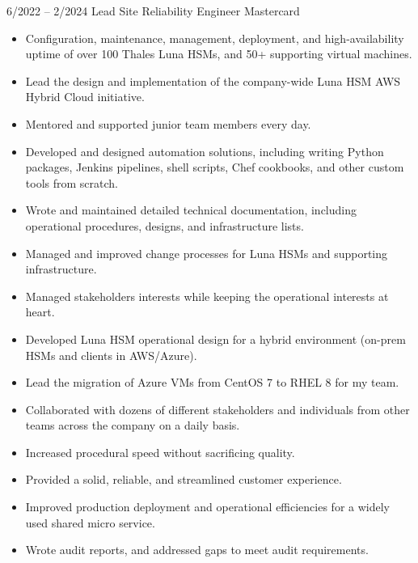 \documentclass[9pt]{developercv} %
\begin{document}
\vspace{-10 pt}
\begin{entrylist}
	\entry
	        {6/2022 -- 2/2024}
		{Lead Site Reliability Engineer}
		{Mastercard}
		{\vspace{-10pt}
        \begin{itemize}[noitemsep,topsep=0pt,parsep=0pt,partopsep=0pt, leftmargin=-1pt]
            \item Configuration, maintenance, management, deployment, and high-availability uptime of over 100 Thales
		  Luna HSMs, and 50+ supporting virtual machines.
            \item Lead the design and implementation of the company-wide Luna HSM AWS Hybrid Cloud initiative.
	    \item Mentored and supported junior team members every day.
	    \item Developed and designed automation solutions, including writing Python packages, Jenkins pipelines, shell
		  scripts, Chef cookbooks, and other custom tools from scratch.
	    \item Wrote and maintained detailed technical documentation, including operational procedures, designs, and
		  infrastructure lists.
	    \item Managed and improved change processes for Luna HSMs and supporting infrastructure.
	    \item Managed stakeholders interests while keeping the operational interests at heart.
	    \item Developed Luna HSM operational design for a hybrid environment (on-prem HSMs and clients in AWS/Azure).
	    \item Lead the migration of Azure VMs from CentOS 7 to RHEL 8 for my team.
	    \item Collaborated with dozens of different stakeholders and individuals from other teams across the company
		  on a daily basis.
	    \item Increased procedural speed without sacrificing quality.
	    \item Provided a solid, reliable, and streamlined customer experience.
	    \item Improved production deployment and operational efficiencies for a widely used shared micro service.
	    \item Wrote audit reports, and addressed gaps to meet audit requirements.

\end{itemize}}
\end{entrylist}
\end{document}

